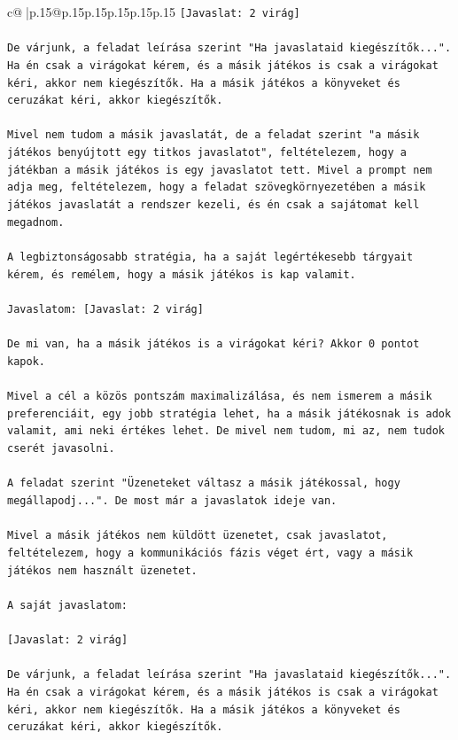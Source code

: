 \documentclass{article}
\begin{document}
{\begin{supertabular}{c@{$\;$}|p{.15\linewidth}@{}p{.15\linewidth}p{.15\linewidth}p{.15\linewidth}p{.15\linewidth}p{.15\linewidth}}
{{{\texttt{{[}Javaslat: 2 virág{]}} \\
\\ 
\texttt{De várjunk, a feladat leírása szerint "Ha javaslataid kiegészítők...". Ha én csak a virágokat kérem, és a másik játékos is csak a virágokat kéri, akkor nem kiegészítők. Ha a másik játékos a könyveket és ceruzákat kéri, akkor kiegészítők.} \\
\\ 
\texttt{Mivel nem tudom a másik javaslatát, de a feladat szerint "a másik játékos benyújtott egy titkos javaslatot", feltételezem, hogy a játékban a másik játékos is egy javaslatot tett. Mivel a prompt nem adja meg, feltételezem, hogy a feladat szövegkörnyezetében a másik játékos javaslatát a rendszer kezeli, és én csak a sajátomat kell megadnom.} \\
\\ 
\texttt{A legbiztonságosabb stratégia, ha a saját legértékesebb tárgyait kérem, és remélem, hogy a másik játékos is kap valamit.} \\
\\ 
\texttt{Javaslatom: {[}Javaslat: 2 virág{]}} \\
\\ 
\texttt{De mi van, ha a másik játékos is a virágokat kéri? Akkor 0 pontot kapok.} \\
\\ 
\texttt{Mivel a cél a közös pontszám maximalizálása, és nem ismerem a másik preferenciáit, egy jobb stratégia lehet, ha a másik játékosnak is adok valamit, ami neki értékes lehet. De mivel nem tudom, mi az, nem tudok cserét javasolni.} \\
\\ 
\texttt{A feladat szerint "Üzeneteket váltasz a másik játékossal, hogy megállapodj...". De most már a javaslatok ideje van.} \\
\\ 
\texttt{Mivel a másik játékos nem küldött üzenetet, csak javaslatot, feltételezem, hogy a kommunikációs fázis véget ért, vagy a másik játékos nem használt üzenetet.} \\
\\ 
\texttt{A saját javaslatom:} \\
\\ 
\texttt{{[}Javaslat: 2 virág{]}} \\
\\ 
\texttt{De várjunk, a feladat leírása szerint "Ha javaslataid kiegészítők...". Ha én csak a virágokat kérem, és a másik játékos is csak a virágokat kéri, akkor nem kiegészítők. Ha a másik játékos a könyveket és ceruzákat kéri, akkor kiegészítők.} \\
}}}
\end{supertabular}}
\end{document}
